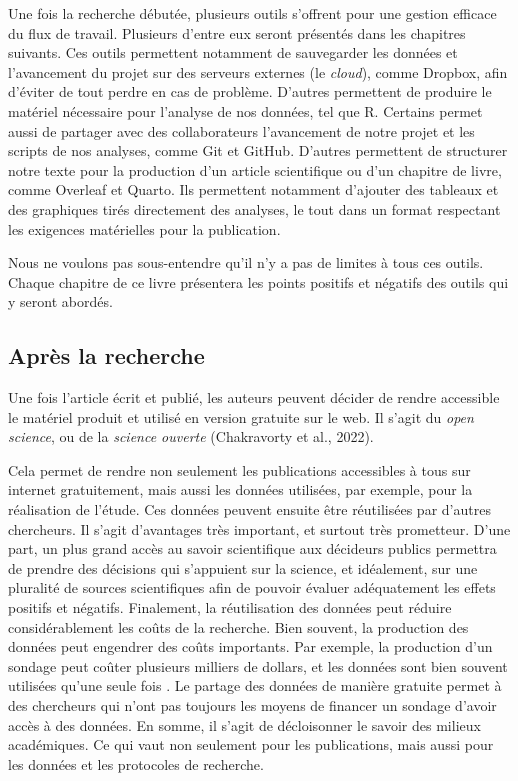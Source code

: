 \documentclass[
  letterpaper,
  DIV=11,
  numbers=noendperiod]{scrreprt}
\begin{document}
Une fois la recherche débutée, plusieurs outils s'offrent pour une
gestion efficace du flux de travail. Plusieurs d'entre eux seront
présentés dans les chapitres suivants. Ces outils permettent notamment
de sauvegarder les données et l'avancement du projet sur des serveurs
externes (le \emph{cloud}), comme Dropbox, afin d'éviter de tout perdre
en cas de problème. D'autres permettent de produire le matériel
nécessaire pour l'analyse de nos données, tel que R. Certains permet
aussi de partager avec des collaborateurs l'avancement de notre projet
et les scripts de nos analyses, comme Git et GitHub. D'autres permettent
de structurer notre texte pour la production d'un article scientifique
ou d'un chapitre de livre, comme Overleaf et Quarto. Ils permettent
notamment d'ajouter des tableaux et des graphiques tirés directement des
analyses, le tout dans un format respectant les exigences matérielles
pour la publication.

Nous ne voulons pas sous-entendre qu'il n'y a pas de limites à tous ces
outils. Chaque chapitre de ce livre présentera les points positifs et
négatifs des outils qui y seront abordés.

\hypertarget{apruxe8s-la-recherche}{%
\subsection{Après la recherche}\label{apruxe8s-la-recherche}}

Une fois l'article écrit et publié, les auteurs peuvent décider de
rendre accessible le matériel produit et utilisé en version gratuite sur
le web. Il s'agit du \emph{open science}, ou de la \emph{science
ouverte} (Chakravorty et al., 2022).

Cela permet de rendre non seulement les publications accessibles à tous
sur internet gratuitement, mais aussi les données utilisées, par
exemple, pour la réalisation de l'étude. Ces données peuvent ensuite
être réutilisées par d'autres chercheurs. Il s'agit d'avantages très
important, et surtout très prometteur. D'une part, un plus grand accès
au savoir scientifique aux décideurs publics permettra de prendre des
décisions qui s'appuient sur la science, et idéalement, sur une
pluralité de sources scientifiques afin de pouvoir évaluer adéquatement
les effets positifs et négatifs. Finalement, la réutilisation des
données peut réduire considérablement les coûts de la recherche. Bien
souvent, la production des données peut engendrer des coûts importants.
Par exemple, la production d'un sondage peut coûter plusieurs milliers
de dollars, et les données sont bien souvent utilisées qu'une seule fois
. Le partage des données de manière gratuite permet à des chercheurs qui
n'ont pas toujours les moyens de financer un sondage d'avoir accès à des
données. En somme, il s'agit de décloisonner le savoir des milieux
académiques. Ce qui vaut non seulement pour les publications, mais aussi
pour les données et les protocoles de recherche.
\end{document}
